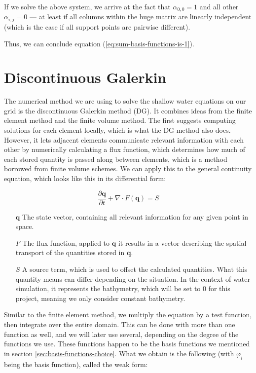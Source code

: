 \documentclass{article}
\newcommand{\pd}[2]{\dfrac{\partial #1}{\partial #2}}
\renewcommand{\phi}{\varphi}
\begin{document}
If we solve the above system, we arrive at the fact that $\alpha_{0,0}=1$ and all other $\alpha_{i,j}=0$ --- at least if all columns within the huge matrix are linearly independent (which is the case if all support points are pairwise different).

Thus, we can conclude equation (\ref{eq:sum-basis-functions-is-1}).

\section{Discontinuous Galerkin}
\label{sec:discontinuous-galerkin}

The numerical method we are using to solve the shallow water equations on our grid is the discontinuous Galerkin method (DG). It combines ideas from the finite element method and the finite volume method. The first suggests computing solutions for each element locally, which is what the DG method also does. However, it lets adjacent elements communicate relevant information with each other by numerically calculating a flux function, which determines how much of each stored quantity is passed along between elements, which is a method borrowed from finite volume schemes. We can apply this to the general continuity equation, which looks like this in its differential form:

\begin{equation}
  \label{eq:general-continuity-equation}
  \pd{\mathbf{q}}{t} + \nabla \cdot F(\mathbf{q}) = S
\end{equation}

\begin{itemize}
\item[$\mathbf{q}$] The state vector, containing all relevant information for any given point in space.
\item[$F$] The flux function, applied to $\mathbf{q}$ it results in a vector describing the spatial transport of the quantities stored in $\mathbf{q}$.
\item[$S$] A source term, which is used to offset the calculated quantities. What this quantity means can differ depending on the situation. In the context of water simulation, it represents the bathymetry, which will be set to 0 for this project, meaning we only consider constant bathymetry.
\end{itemize}

Similar to the finite element method, we multiply the equation by a test function, then integrate over the entire domain. This can be done with more than one function as well, and we will later use several, depending on the degree of the functions we use. These functions happen to be the basis functions we mentioned in section \ref{sec:basis-functions-choice}. What we obtain is the following (with $\phi_i$ being the basis function), called the weak form:
\end{document}
